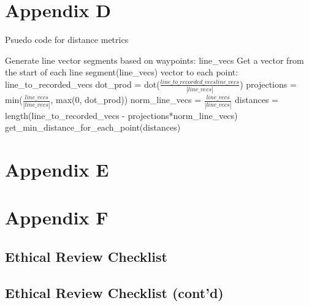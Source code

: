 %
%

\chapter{Appendix D}\label{app:app04}
Psuedo code for distance metrics
\begin{algorithm}
    Generate line vector segments based on waypoints: line_vecs
    Get a vector from the start of each line segment(line_vecs) vector to each point: line_to_recorded_vecs
    dot_prod = dot($\frac{line\_to\_recorded\_vecsline\_vecs}{|line\_vecs|}$)
    projections = min($\frac{line\_vecs}{|line\_vecs|}$, max(0, dot_prod))
    norm_line_vecs = $\frac{line\_vecs}{|line\_vecs|}$
    distances = length(line_to_recorded_vecs - projections*norm_line_vecs)
    get_min_distance_for_each_point(distances)

\end{algorithm}

\chapter{Appendix E}\label{ch:appendix-e}
\begin{figure}[h!]
    
\end{figure}

\chapter{Appendix F}\label{ch:appendix-f}
\newpage
\section{Ethical Review Checklist}
\begin{figure}[h!]
    
\end{figure}
\newpage
\section{Ethical Review Checklist (cont'd)}
\begin{figure}[h!]
    
\end{figure}